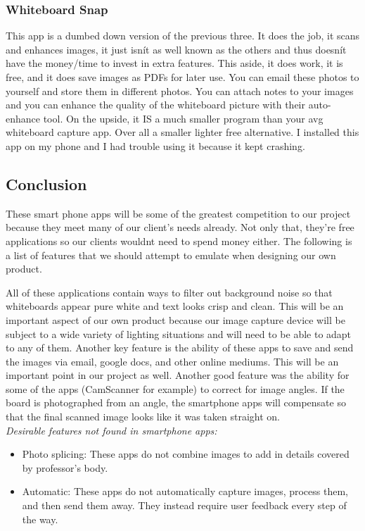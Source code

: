\documentclass{article}
\begin{document}
				\subsubsection*{Whiteboard Snap}
					
This app is a dumbed down version of the previous three. It does the job, it scans and enhances images, it just isnít as well known as the others and thus doesnít have the money/time to invest in extra features. This aside, it does work, it is free, and it does save images as PDFs for later use. You can email these photos to yourself and store them in different photos. You can attach notes to your images and you can enhance the quality of the whiteboard picture with their auto-enhance tool. On the upside, it IS a much smaller program than your avg whiteboard capture app. Over all a smaller lighter free alternative. I installed this app on my phone and I had trouble using it because it kept crashing. \cite{wbs}  \\

     \subsection*{Conclusion}
These smart phone apps will be some of the greatest competition to our project because they meet many of our client's needs already. Not only that, they're free applications so our clients wouldnt need to spend money either. The following is a list of features that we should attempt to emulate when designing our own product.

All of these applications contain ways to filter out background noise so that whiteboards appear pure white and text looks crisp and clean. This will be an important aspect of our own product because our image capture device will be subject to a wide variety of lighting situations and will need to be able to adapt to any of them.
Another key feature is the ability of these apps to save and send the images via email, google docs, and other online mediums. This will be an important point in our project as well.
Another good feature was the ability for some of the apps (CamScanner for example) to correct for image angles. If the board is photographed from an angle, the smartphone apps will compensate so that the final scanned image looks like it was taken straight on. \\

        \emph{Desirable features not found in smartphone apps:}
        \begin{itemize} \itemsep -2pt
            \item Photo splicing: These apps do not combine images to add in details covered by professor's body.
            \item Automatic: These apps do not automatically capture images, process them, and then send them away. They instead require user feedback every step of the way.
        \end{itemize}
\end{document}
